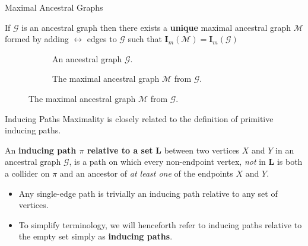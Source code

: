 \documentclass[english, compress, red]{beamer}
\begin{document}
\begin{frame}{Maximal Ancestral Graphs}
	\begin{theorem}If $\mathcal{G}$ is an ancestral graph then there exists a \textbf{unique} maximal ancestral graph $\mathcal{M}$ formed by adding $\leftrightarrow$ edges to $\mathcal{G}$ such that $\mathbf{I}_m (\mathcal{M}) = \mathbf{I}_m(\mathcal{G})$
	\end{theorem}
	
	 \begin{figure}
		\begin{subfigure}{0.48\textwidth}
			\centering
			\caption{An ancestral graph $\mathcal{G}$.}
		\end{subfigure}
		\hfill
		\begin{subfigure}{0.48\textwidth}
			\centering
			\caption{The maximal ancestral graph $\mathcal{M}$ from $\mathcal{G}$.}
		\end{subfigure}
	\end{figure}
\end{frame}

\begin{frame}{Inducing Paths}
	Maximality is closely related to the definition of primitive inducing paths.
	
	\begin{definition}
		An \textbf{inducing path $\pi$ relative to a set} $\mathbf{L}$ between two vertices $X$ and $Y$ in an ancestral graph $\mathcal{G}$, is a path on which every non-endpoint vertex, \textit{not} in $\mathbf{L}$ is both a collider on $\pi$ and an ancestor of \textit{at least one} of the endpoints $X$ and $Y$.
	\end{definition}
    \begin{itemize}
    	\item Any single-edge path is trivially an inducing path relative to any set of vertices.
    	\item To simplify terminology, we will henceforth refer to inducing paths relative to the empty set simply as \textbf{inducing paths}.
    \end{itemize}
\end{frame}
\end{document}
